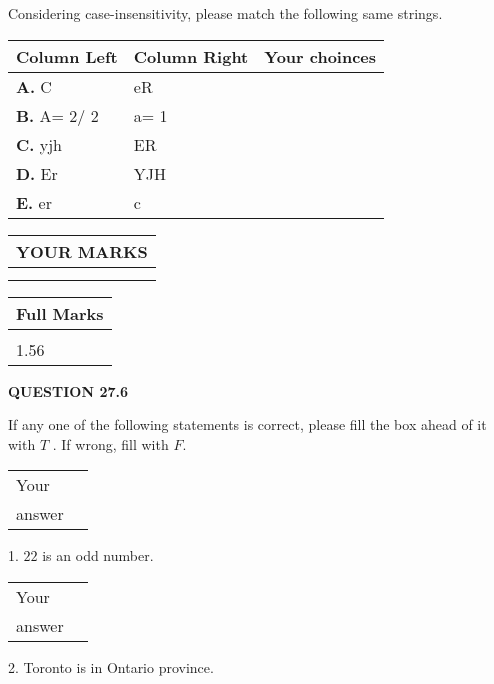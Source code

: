 \documentclass[12pt]{article}
\begin{document}
  
Considering case-insensitivity, please match the following same strings.
  
  
\begin{tabular}{|l|l|l|}
 \hline
 Column Left & Column Right  & Your choinces \\ 
 \hline
{\textbf{\large{
A.}}}
C
  & 
eR
 & 
 \\ 
 \hline
{\textbf{\large{
B.}}}
 A= %
2/ %
2

  & 
 a= %
1
 & 
 \\ 
 \hline
{\textbf{\large{
C.}}}
yjh
  & 
ER
 & 
 \\ 
 \hline
{\textbf{\large{
D.}}}
Er
  & 
YJH
 & 
 \\ 
 \hline
{\textbf{\large{
E.}}}
er
  & 
c
 & 
 \\ 
 \hline
 \end{tabular}
  
  
 
  
\vspace{0.2in}
  
\noindent\begin{tabular}{|l|}
\hline
 YOUR MARKS  \\
\hline
 \\ 
 \\ 
\hline
\end{tabular}
\hspace{0.05in} \begin{tabular}{|l|}
\hline
 Full Marks  \\
\hline
 \\ 
1.56 \\
\hline
\end{tabular}
{\textbf{\Large{QUESTION
27.6 
}}}
  
  
If any one of the following statements is correct, please fill the box ahead of it with $T$ .
If wrong, fill with $F$.
 
\noindent\begin{tabular}{|l|l|}\hline Your&\hspace{.2in} \\ answer&\hspace{.2in} \\ \hline \end{tabular}
1. $ %
22$ is an  %
odd number.
 
\noindent\begin{tabular}{|l|l|}\hline Your&\hspace{.2in} \\ answer&\hspace{.2in} \\ \hline \end{tabular}
2.  %
Toronto is in  %
Ontario province.
 
\end{document}
